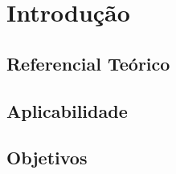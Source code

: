 \chapter{Introdução} \label{intro}

\section{Referencial Teórico}

\section{Aplicabilidade}

\section{Objetivos}


